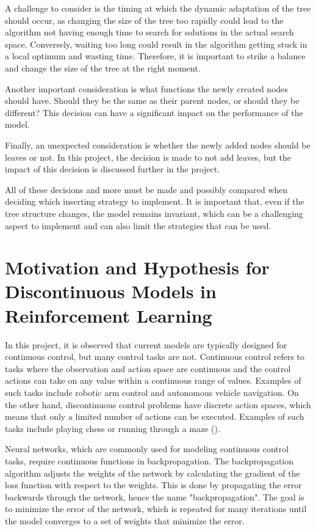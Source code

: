 A challenge to consider is the timing at which the dynamic adaptation of the tree should occur, as changing the size of the tree too rapidly could lead to the algorithm not having enough time to search for solutions in the actual search space. Conversely, waiting too long could result in the algorithm getting stuck in a local optimum and wasting time. Therefore, it is important to strike a balance and change the size of the tree at the right moment.

Another important consideration is what functions the newly created nodes should have. Should they be the same as their parent nodes, or should they be different? This decision can have a significant impact on the performance of the model.

Finally, an unexpected consideration is whether the newly added nodes should be leaves or not. In this project, the decision is made to not add leaves, but the impact of this decision is discussed further in the project.

All of these decisions and more must be made and possibly compared when deciding which inserting strategy to implement. It is important that, even if the tree structure changes, the model remains invariant, which can be a challenging aspect to implement and can also limit the strategies that can be used.


\section{Motivation and Hypothesis for Discontinuous Models in Reinforcement Learning}

In this project, it is observed that current models are typically designed for continuous control, but many control tasks are not. Continuous control refers to tasks where the observation and action space are continuous and the control actions can take on any value within a continuous range of values. Examples of such tasks include robotic arm control and autonomous vehicle navigation. On the other hand, discontinuous control problems have discrete action spaces, which means that only a limited number of actions can be executed. Examples of such tasks include playing chess or running through a maze (\cite{sutton_reinforcement_2018}).

Neural networks, which are commonly used for modeling continuous control tasks, require continuous functions in backpropagation. The backpropagation algorithm adjusts the weights of the network by calculating the gradient of the loss function with respect to the weights. This is done by propagating the error backwards through the network, hence the name "backpropagation". The goal is to minimize the error of the network, which is repeated for many iterations until the model converges to a set of weights that minimize the error.

